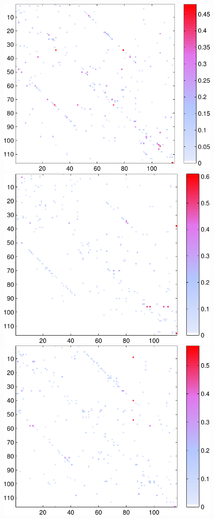 \documentclass[a4paper, 10pt, english, onecolumn]{article}
\begin{document}
\begin{figure}[h!]
  \centering
  \includegraphics[height=0.26\textheight]{images/new/assym_subj1_expl-crop}
  \includegraphics[height=0.26\textheight]{images/new/assym_subj2_expl-crop}
  \includegraphics[height=0.26\textheight]{images/new/assym_subj3_expl-crop}

\end{figure}
\end{document}
